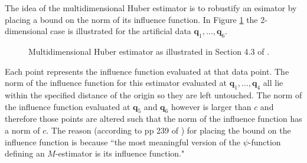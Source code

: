 \documentclass{article}\usepackage[]{graphicx}\usepackage[]{color}
\begin{document}
The idea of the multidimensional Huber estimator is to robustify an esimator by placing a bound on the norm of its influence function.  In Figure \ref{fig:Huber} the 2-dimensional case is illustrated for the artificial data $\bm q_1,\dots,\bm q_6$.
\begin{figure}
\begin{center}
\end{center}
\caption{Multidimensional Huber estimator as illustrated in Section 4.3 of \cite{hampel2011}.}
\label{fig:Huber}
\end{figure}

Each point represents the influence function evaluated at that data point.  The norm of the influence function for this estimator evaluated at $\bm q_1,\dots,\bm q_4$ all lie within the specified distance of the origin so they are left untouched.  The norm of the influence function evaluated at $\bm q_5$ and $\bm q_6$ however is larger than $c$ and therefore those points are altered such that the norm of the influence function has a norm of $c$.  The reason (according to pp 239 of \citealt{hampel2011}) for placing the bound on the influence function is because  ``the most meaningful version of the $\psi$-function defining an $M$-estimator is its influence function."
\end{document}
